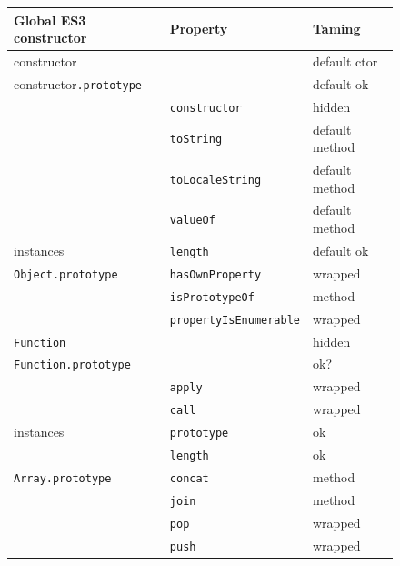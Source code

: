 \documentclass[letterpaper,twocolumn,10pt]{article}
\newcommand{\code}[1]{{\tt {#1}}}              %
\begin{document}
\begin{figure}
\begin{tabular}{lll}
  Global ES3 constructor         & Property                    & Taming \\
  \hline 
  constructor                    &                             & default ctor \\
  constructor\code{.prototype}   &                             & default ok \\
                                 & \code{constructor}          & hidden \\
                                 & \code{toString}             & default method \\
                                 & \code{toLocaleString}       & default method \\
                                 & \code{valueOf}              & default method \\
  instances                      & \code{length}               & default ok \\
  \hline
  \code{Object.prototype}        & \code{hasOwnProperty}       & wrapped \\
                                 & \code{isPrototypeOf}        & method \\
                                 & \code{propertyIsEnumerable} & wrapped \\
  \hline
  \code{Function}                &                             & hidden \\
  \code{Function.prototype}      &                             & ok? \\
                                 & \code{apply}                & wrapped \\
                                 & \code{call}                 & wrapped \\
  instances                      & \code{prototype}            & ok \\
                                 & \code{length}               & ok \\
  \hline
  \code{Array.prototype}         & \code{concat}               & method \\
                                 & \code{join}                 & method \\
                                 & \code{pop}                  & wrapped \\
                                 & \code{push}                 & wrapped \\

\end{tabular}
\end{figure}
\end{document}
